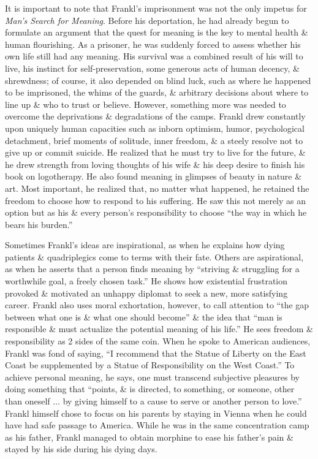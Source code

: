 \documentclass{article}
\numberwithin{equation}{section}
\begin{document}
It is important to note that Frankl's imprisonment was not the only impetus for \textit{Man's Search for Meaning}. Before his deportation, he had already begun to formulate an argument that the quest for meaning is the key to mental health \& human flourishing. As a prisoner, he was suddenly forced to assess whether his own life still had any meaning. His survival was a combined result of his will to live, his instinct for self-preservation, some generous acts of human decency, \& shrewdness; of course, it also depended on blind luck, such as where he happened to be imprisoned, the whims of the guards, \& arbitrary decisions about where to line up \& who to trust or believe. However, something more was needed to overcome the deprivations \& degradations of the camps. Frankl drew constantly upon uniquely human capacities such as inborn optimism, humor, psychological detachment, brief moments of solitude, inner freedom, \& a steely resolve not to give up or commit suicide. He realized that he must try to live for the future, \& he drew strength from loving thoughts of his wife \& his deep desire to finish his book on logotherapy. He also found meaning in glimpses of beauty in nature \& art. Most important, he realized that, no matter what happened, he retained the freedom to choose how to respond to his suffering. He saw this not merely as an option but as his \& every person's responsibility to choose ``the way in which he bears his burden.''

Sometimes Frankl's ideas are inspirational, as when he explains how dying patients \& quadriplegics come to terms with their fate. Others are aspirational, as when he asserts that a person finds meaning by ``striving \& struggling for a worthwhile goal, a freely chosen task.'' He shows how existential frustration provoked \& motivated an unhappy diplomat to seek a new, more satisfying career. Frankl also uses moral exhortation, however, to call attention to ``the gap between what one is \& what one should become'' \& the idea that ``man is responsible \& must actualize the potential meaning of his life.'' He sees freedom \& responsibility as 2 sides of the same coin. When he spoke to American audiences, Frankl was fond of saying, ``I recommend that the Statue of Liberty on the East Coast be supplemented by a Statue of Responsibility on the West Coast.'' To achieve personal meaning, he says, one must transcend subjective pleasures by doing something that ``points, \& is directed, to something, or someone, other than oneself $\ldots$ by giving himself to a cause to serve or another person to love.'' Frankl himself chose to focus on his parents by staying in Vienna when he could have had safe passage to America. While he was in the same concentration camp as his father, Frankl managed to obtain morphine to ease his father's pain \& stayed by his side during his dying days.
\end{document}
